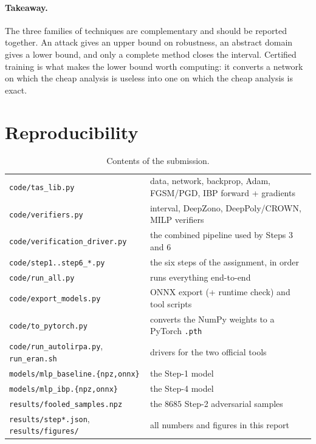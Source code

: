 \documentclass[11pt,a4paper]{article}
\begin{document}
\paragraph{Takeaway.} The three families of techniques are complementary and
should be reported together. An attack gives an upper bound on robustness, an
abstract domain gives a lower bound, and only a complete method closes the
interval. Certified training is what makes the lower bound worth computing: it
converts a network on which the cheap analysis is useless into one on which the
cheap analysis is exact.

\section{Reproducibility}

\begin{table}[H]
\centering\footnotesize
\begin{tabular}{@{}p{5.2cm}p{10.3cm}@{}}
\toprule
\texttt{code/tas\_lib.py} & data, network, backprop, Adam, FGSM/PGD, IBP forward + gradients\\
\texttt{code/verifiers.py} & interval, DeepZono, DeepPoly/CROWN, MILP verifiers\\
\texttt{code/verification\_driver.py} & the combined pipeline used by Steps 3 and 6\\
\texttt{code/step1..step6\_*.py} & the six steps of the assignment, in order\\
\texttt{code/run\_all.py} & runs everything end-to-end\\
\texttt{code/export\_models.py} & ONNX export (+ runtime check) and tool scripts\\
\texttt{code/to\_pytorch.py} & converts the NumPy weights to a PyTorch \texttt{.pth}\\
\texttt{code/run\_autolirpa.py}, \texttt{run\_eran.sh} & drivers for the two official tools\\
\texttt{models/mlp\_baseline.\{npz,onnx\}} & the Step-1 model\\
\texttt{models/mlp\_ibp.\{npz,onnx\}} & the Step-4 model\\
\texttt{results/fooled\_samples.npz} & the $8685$ Step-2 adversarial samples\\
\texttt{results/step*.json}, \texttt{results/figures/} & all numbers and figures in this report\\
\bottomrule
\end{tabular}
\caption{Contents of the submission.}
\end{table}
\end{document}

